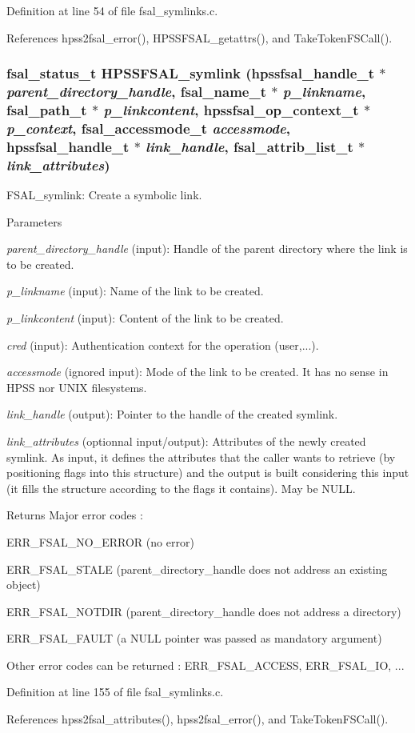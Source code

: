 Definition at line 54 of file fsal\_\-symlinks.c.

References hpss2fsal\_\-error(), HPSSFSAL\_\-getattrs(), and TakeTokenFSCall().
\subsubsection[{HPSSFSAL\_\-symlink}]{\setlength{\rightskip}{0pt plus 5cm}fsal\_\-status\_\-t HPSSFSAL\_\-symlink (hpssfsal\_\-handle\_\-t $\ast$ {\em parent\_\-directory\_\-handle}, \/  fsal\_\-name\_\-t $\ast$ {\em p\_\-linkname}, \/  fsal\_\-path\_\-t $\ast$ {\em p\_\-linkcontent}, \/  hpssfsal\_\-op\_\-context\_\-t $\ast$ {\em p\_\-context}, \/  fsal\_\-accessmode\_\-t {\em accessmode}, \/  hpssfsal\_\-handle\_\-t $\ast$ {\em link\_\-handle}, \/  fsal\_\-attrib\_\-list\_\-t $\ast$ {\em link\_\-attributes})}\label{fsal__symlinks_8c_af82ce1c92a125736a369858d8e7f6f85}
FSAL\_\-symlink: Create a symbolic link.


\begin{DoxyParams}{Parameters}
\item[{\em parent\_\-directory\_\-handle}](input): Handle of the parent directory where the link is to be created. \item[{\em p\_\-linkname}](input): Name of the link to be created. \item[{\em p\_\-linkcontent}](input): Content of the link to be created. \item[{\em cred}](input): Authentication context for the operation (user,...). \item[{\em accessmode}](ignored input): Mode of the link to be created. It has no sense in HPSS nor UNIX filesystems. \item[{\em link\_\-handle}](output): Pointer to the handle of the created symlink. \item[{\em link\_\-attributes}](optionnal input/output): Attributes of the newly created symlink. As input, it defines the attributes that the caller wants to retrieve (by positioning flags into this structure) and the output is built considering this input (it fills the structure according to the flags it contains). May be NULL.\end{DoxyParams}
\begin{DoxyReturn}{Returns}
Major error codes :
\begin{DoxyItemize}
\item ERR\_\-FSAL\_\-NO\_\-ERROR (no error)
\item ERR\_\-FSAL\_\-STALE (parent\_\-directory\_\-handle does not address an existing object)
\item ERR\_\-FSAL\_\-NOTDIR (parent\_\-directory\_\-handle does not address a directory)
\item ERR\_\-FSAL\_\-FAULT (a NULL pointer was passed as mandatory argument)
\item Other error codes can be returned : ERR\_\-FSAL\_\-ACCESS, ERR\_\-FSAL\_\-IO, ... 
\end{DoxyItemize}
\end{DoxyReturn}


Definition at line 155 of file fsal\_\-symlinks.c.

References hpss2fsal\_\-attributes(), hpss2fsal\_\-error(), and TakeTokenFSCall().